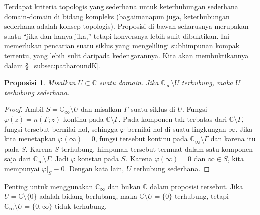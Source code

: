 \documentclass[12pt,openany]{book}
\newcommand{\C}{{\mathbb{C}}}
\newcommand{\myquote}[1]{``#1''}
\theoremstyle{plain}
\newtheorem{prop}[thm]{Proposisi}
\theoremstyle{remark}
\theoremstyle{definition}
\theoremstyle{exercise}
\theoremstyle{example}
\newcommand{\subsectionref}[1]{\hyperref[#1]{\S~\ref*{#1}}}
\begin{document}
Terdapat kriteria topologis yang sederhana untuk
keterhubungan sederhana domain-domain di bidang kompleks
(bagaimanapun juga, keterhubungan sederhana adalah konsep topologis).
Proposisi di bawah seharusnya merupakan suatu \myquote{jika dan hanya jika,} tetapi
konversnya lebih sulit dibuktikan.
Ini memerlukan pencarian suatu siklus yang mengelilingi
subhimpunan kompak tertentu,
yang lebih sulit daripada kedengarannya.
Kita akan membuktikannya dalam \subsectionref{subsec:patharoundK}.

\begin{prop} \label{prop:scbycomplementeasy}
Misalkan $U \subset \C$ suatu domain. Jika
$\C_\infty \setminus U$ terhubung, maka $U$ terhubung sederhana.
\end{prop}

\begin{proof}
Ambil $S = \C_\infty \setminus U$ dan misalkan $\Gamma$ suatu siklus di $U$.
Fungsi $\varphi(z)= n(\Gamma;z)$ kontinu pada 
$\C \setminus \Gamma$.
Pada komponen tak terbatas dari $\C \setminus \Gamma$, fungsi tersebut
bernilai nol, sehingga $\varphi$ bernilai nol di suatu lingkungan $\infty$.
Jika kita menetapkan $\varphi(\infty) = 0$, fungsi tersebut kontinu
pada $\C_\infty \setminus \Gamma$ dan karena itu pada $S$. Karena $S$ terhubung,
himpunan tersebut termuat dalam
satu komponen saja dari $\C_\infty \setminus \Gamma$.
Jadi $\varphi$
konstan pada $S$.
Karena $\varphi(\infty) = 0$ dan $\infty \in S$, kita mempunyai $\varphi|_S \equiv 0$.
Dengan kata lain, $U$ terhubung sederhana.
\end{proof}

Penting untuk menggunakan $\C_\infty$ dan bukan $\C$ dalam proposisi tersebut.
Jika $U = \C \setminus \{ 0 \}$ adalah bidang berlubang, maka
$\C \setminus U = \{ 0 \}$ terhubung, tetapi 
$\C_\infty \setminus U = \{ 0, \infty \}$ tidak terhubung.
\end{document}
